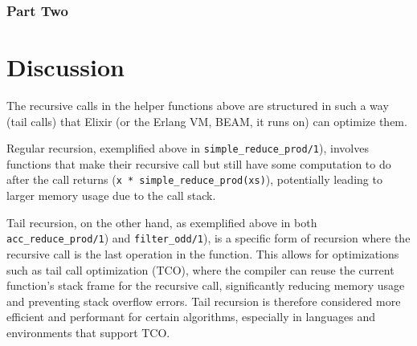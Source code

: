 \documentclass[a4paper,11pt]{article}
\begin{document}
\subsubsection*{Part Two}
\label{subsec:res-part2}

\section*{Discussion}
\label{sec:discussion}
The recursive calls in the helper functions above are structured in such a way
(tail calls) that Elixir (or the Erlang VM, BEAM, it runs on)
can optimize them.

Regular recursion, exemplified above in
\texttt{simple_reduce_prod/1}),
involves functions that make their recursive call but still
have some computation to do after the call returns
(\texttt{x * simple_reduce_prod(xs)}), potentially leading to
larger memory usage due to the call stack.

Tail recursion, on the other hand, as exemplified above in both
\texttt{acc_reduce_prod/1}) and
\texttt{filter_odd/1}),
is a specific form of recursion where the recursive call is the last operation
in the function.
This allows for optimizations such as tail call optimization
(TCO), where the compiler can reuse the current function's stack frame for the
recursive call, significantly reducing memory usage and preventing stack
overflow errors.
Tail recursion is therefore considered more efficient and
performant for certain algorithms, especially in languages and environments
that support TCO.
\end{document}
